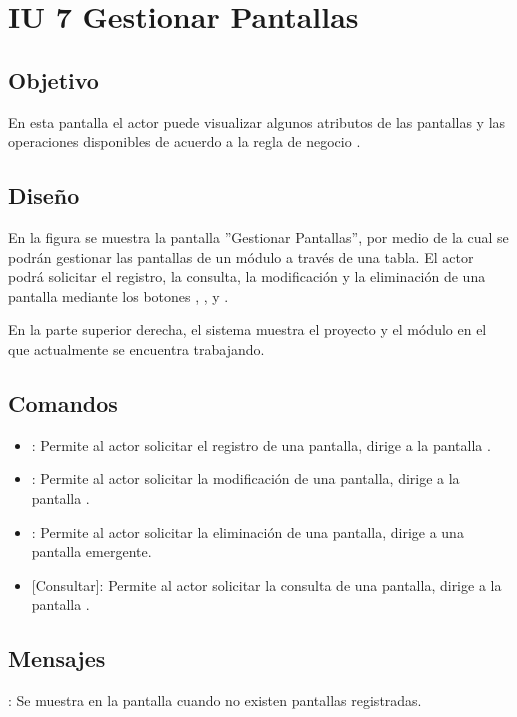 \section{IU 7 Gestionar Pantallas}

\subsection{Objetivo}
	En esta pantalla el actor puede visualizar algunos atributos de las pantallas y las operaciones disponibles de acuerdo a la regla de negocio .
\subsection{Diseño}
	En la figura  se muestra la pantalla ''Gestionar Pantallas'', por medio de la cual se podrán gestionar las pantallas de un módulo a través de una tabla. El actor podrá solicitar el registro, la consulta, la modificación y la eliminación de una pantalla mediante los botones , , \editar y \eliminar.
	
	En la parte superior derecha, el sistema muestra el proyecto y el módulo en el que actualmente se encuentra trabajando.

\subsection{Comandos}
\begin{itemize}
	\item {}: Permite al actor solicitar el registro de una pantalla, dirige a la pantalla .
	\item \editar [Modificar]: Permite al actor solicitar la modificación de una pantalla, dirige a la pantalla .
	\item \eliminar [Eliminar]: Permite al actor solicitar la eliminación de una pantalla, dirige a una pantalla emergente.
	\item {} [Consultar]: Permite al actor solicitar la consulta de una pantalla, dirige a la pantalla  .
\end{itemize}
\subsection{Mensajes}

\begin{Citemize}
	\item {}: Se muestra en la pantalla  cuando no existen pantallas registradas.
\end{Citemize}

